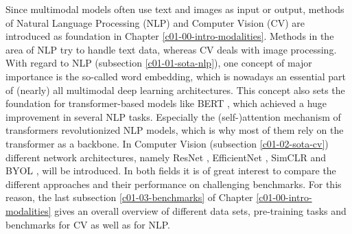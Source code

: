 \documentclass[
]{krantz}
\begin{document}
Since multimodal models often use text and images as input or output, methods of Natural Language Processing (NLP) and Computer Vision (CV) are introduced as foundation in Chapter \ref{c01-00-intro-modalities}. Methods in the area of NLP try to handle text data, whereas CV deals with image processing. With regard to NLP (subsection \ref{c01-01-sota-nlp}), one concept of major importance is the so-called word embedding, which is nowadays an essential part of (nearly) all multimodal deep learning architectures. This concept also sets the foundation for transformer-based models like BERT \citep{BERT}, which achieved a huge improvement in several NLP tasks. Especially the (self-)attention mechanism \citep{attention} of transformers revolutionized NLP models, which is why most of them rely on the transformer as a backbone. In Computer Vision (subsection \ref{c01-02-sota-cv}) different network architectures, namely ResNet \citep{ResNet}, EfficientNet \citep{EfficientNet}, SimCLR \citep{SimCLR} and BYOL \citep{BYOL}, will be introduced. In both fields it is of great interest to compare the different approaches and their performance on challenging benchmarks. For this reason, the last subsection \ref{c01-03-benchmarks} of Chapter \ref{c01-00-intro-modalities} gives an overall overview of different data sets, pre-training tasks and benchmarks for CV as well as for NLP.
\end{document}
